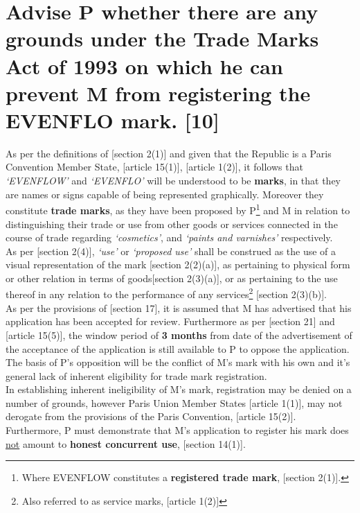 \documentclass[11pt]{article}
\begin{document}
\section{Advise P whether there are any grounds under the Trade Marks Act of 1993 on which he can prevent M from registering the EVENFLO mark. [10]}
\label{sec:orga03dde7}
As per the definitions of [section 2(1)]\cite{rsa93_tm_act} and given that the Republic is a Paris Convention Member State, [article 15(1)]\cite{wto17_trips}, [article 1(2)]\cite{wipo83_paris_conve_protect_ip}, it follows that \emph{`EVENFLOW'} and \emph{`EVENFLO'} will be understood to be \textbf{marks}, in that they are names or signs capable of being represented graphically. Moreover they constitute \textbf{trade marks}, as they have been proposed by P\footnote{Where EVENFLOW constitutes a \textbf{registered trade mark}, [section 2(1)]\cite{rsa93_tm_act}.} and M in relation to distinguishing their trade or use from other goods or services connected in the course of trade regarding \emph{`cosmetics'}, and \emph{`paints and varnishes'} respectively.\\

As per [section 2(4)]\cite{rsa93_tm_act}, \emph{`use'} or \emph{`proposed use'} shall be construed as the use of a visual representation of the mark [section 2(2)(a)]\cite{rsa93_tm_act}, as pertaining to physical form or other relation in terms of goods[section 2(3)(a)]\cite{rsa93_tm_act}, or as pertaining to the use thereof in any relation to the performance of any services\footnote{Also referred to as service marks, [article 1(2)]\cite{wipo83_paris_conve_protect_ip}} [section 2(3)(b)]\cite{rsa93_tm_act}.\\

As per the provisions of [section 17]\cite{rsa93_tm_act}, it is assumed that M has advertised that his application has been accepted for review. Furthermore as per [section 21]\cite{rsa93_tm_act} and [article 15(5)]\cite{wto17_trips}, the window period of \textbf{3 months} from date of the advertisement of the acceptance of the application is still available to P to oppose the application. The basis of P's opposition will be the conflict of M's mark with his own and it's general lack of inherent eligibility for trade mark registration.\\

In establishing inherent ineligibility of M's mark, registration may be denied
on a number of grounds, however Paris Union Member States [article
1(1)]\cite{wipo83_paris_conve_protect_ip}, may not derogate from the provisions of
the Paris Convention, [article 15(2)]\cite{wto17_trips}. Furthermore, P must
demonstrate that M's application to register his mark does \uline{not} amount to \textbf{honest
concurrent use}, [section 14(1)]\cite{rsa93_tm_act}.\\
\end{document}
